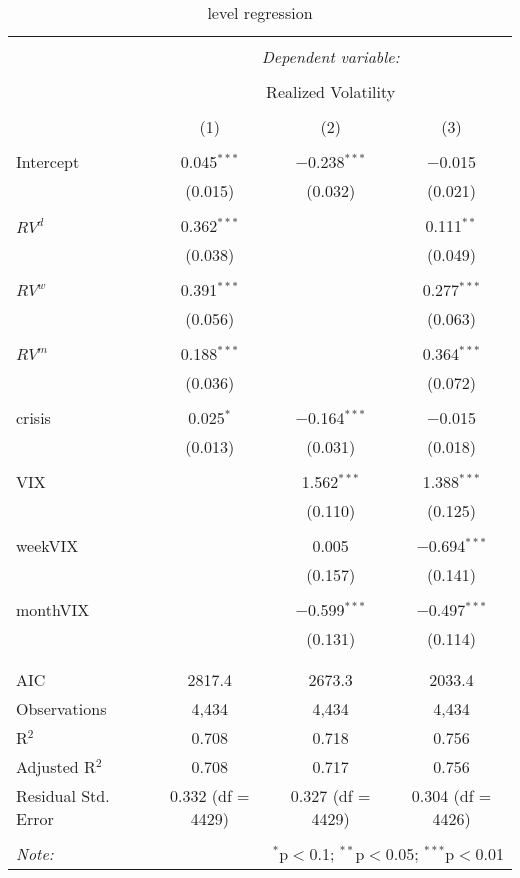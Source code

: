 
\begin{table}[!htbp] \centering 
  \caption{level regression} 
  \label{} 
\begin{tabular}{@{\extracolsep{5pt}}lccc} 
\\[-1.8ex]\hline 
\hline \\[-1.8ex] 
 & \multicolumn{3}{c}{\textit{Dependent variable:}} \\ 
\cline{2-4} 
\\[-1.8ex] & \multicolumn{3}{c}{Realized Volatility} \\ 
\\[-1.8ex] & (1) & (2) & (3)\\ 
\hline \\[-1.8ex] 
 Intercept & 0.045$^{***}$ & $-$0.238$^{***}$ & $-$0.015 \\ 
  & (0.015) & (0.032) & (0.021) \\ 
  & & & \\ 
 $RV^{d}$ & 0.362$^{***}$ &  & 0.111$^{**}$ \\ 
  & (0.038) &  & (0.049) \\ 
  & & & \\ 
 $RV^{w}$ & 0.391$^{***}$ &  & 0.277$^{***}$ \\ 
  & (0.056) &  & (0.063) \\ 
  & & & \\ 
 $RV^{m}$ & 0.188$^{***}$ &  & 0.364$^{***}$ \\ 
  & (0.036) &  & (0.072) \\ 
  & & & \\ 
 crisis & 0.025$^{*}$ & $-$0.164$^{***}$ & $-$0.015 \\ 
  & (0.013) & (0.031) & (0.018) \\ 
  & & & \\ 
 VIX &  & 1.562$^{***}$ & 1.388$^{***}$ \\ 
  &  & (0.110) & (0.125) \\ 
  & & & \\ 
 weekVIX &  & 0.005 & $-$0.694$^{***}$ \\ 
  &  & (0.157) & (0.141) \\ 
  & & & \\ 
 monthVIX &  & $-$0.599$^{***}$ & $-$0.497$^{***}$ \\ 
  &  & (0.131) & (0.114) \\ 
  & & & \\ 
\hline \\[-1.8ex] 
AIC & 2817.4 & 2673.3 & 2033.4 \\ 
Observations & 4,434 & 4,434 & 4,434 \\ 
R$^{2}$ & 0.708 & 0.718 & 0.756 \\ 
Adjusted R$^{2}$ & 0.708 & 0.717 & 0.756 \\ 
Residual Std. Error & 0.332 (df = 4429) & 0.327 (df = 4429) & 0.304 (df = 4426) \\ 
\hline 
\hline \\[-1.8ex] 
\textit{Note:}  & \multicolumn{3}{r}{$^{*}$p$<$0.1; $^{**}$p$<$0.05; $^{***}$p$<$0.01} \\ 
\end{tabular} 
\end{table} 
